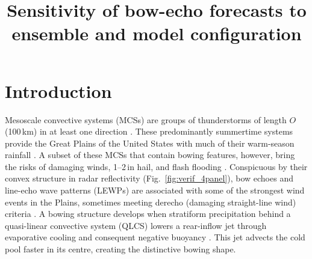 \documentclass{ametsoc}
\title{Sensitivity of bow-echo forecasts to ensemble and model configuration}
\affiliation{Department of Geological and Atmospheric Sciences, Iowa State University, United States of America.}
\begin{document}
\maketitle


\sloppy 
\section{Introduction}

Mesoscale convective systems (MCSs) are groups of thunderstorms of length $O$(100\,km) in at least one direction \citep{American_Meteorological_Society2014-mi}. These predominantly summertime systems provide the Great Plains of the United States with much of their warm-season rainfall \citep{Fritsch1986-xs}. A subset of these MCSs that contain bowing features, however, bring the risks of damaging winds, 1--2\,in hail, and flash flooding \citep{Gallus2008-bm}. Conspicuous by their convex structure in radar reflectivity (Fig.~\ref{fig:verif_4panel}), bow echoes and line-echo wave patterns (LEWPs) are associated with some of the strongest wind events in the Plains, sometimes meeting derecho (damaging straight-line wind) criteria \citep{Johns1987-qj}. A bowing structure develops when stratiform precipitation behind a quasi-linear convective system (QLCS) lowers a rear-inflow jet through evaporative cooling and consequent negative buoyancy \citep{Markowski2010-xi}. This jet advects the cold pool faster in its centre, creating the distinctive bowing shape. 
\end{document}
